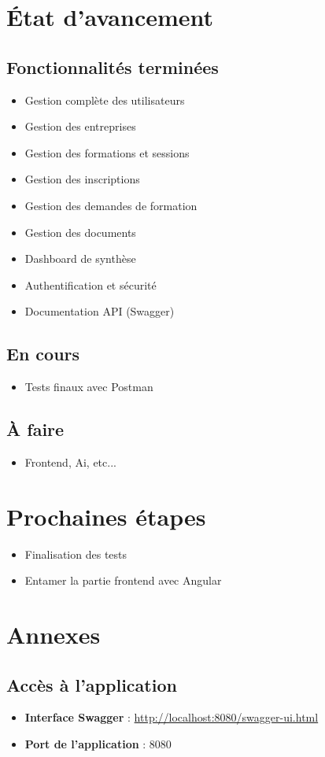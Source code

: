 \documentclass[a4paper,12pt]{article}
\begin{document}
\section{État d'avancement}

\subsection*{Fonctionnalités terminées}
\begin{itemize}
    \item Gestion complète des utilisateurs
    \item Gestion des entreprises
    \item Gestion des formations et sessions
    \item Gestion des inscriptions
    \item Gestion des demandes de formation
    \item Gestion des documents
    \item Dashboard de synthèse
    \item Authentification et sécurité
    \item Documentation API (Swagger)
\end{itemize}

\subsection*{En cours}
\begin{itemize}
    \item Tests finaux avec Postman
\end{itemize}

\subsection*{À faire}
\begin{itemize}
    \item Frontend, Ai, etc...
\end{itemize}

\section{Prochaines étapes}

\begin{itemize}
    \item Finalisation des tests
    \item Entamer la partie frontend avec Angular
\end{itemize}

\section*{Annexes}

\subsection*{Accès à l'application}

\begin{itemize}
    \item \textbf{Interface Swagger} : \url{http://localhost:8080/swagger-ui.html}
    \item \textbf{Port de l'application} : 8080
\end{itemize}
\end{document}
